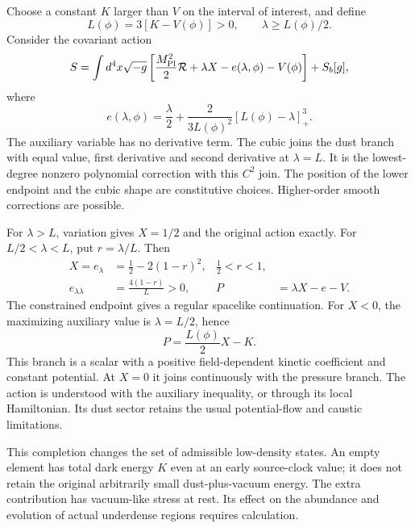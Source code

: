 \documentclass[11pt]{article}
\begin{document}
Choose a constant $K$ larger than $V$ on the interval of interest, and define
\begin{equation}
 L(\phi)=3[K-V(\phi)]>0,\qquad \lambda\ge L(\phi)/2.
\end{equation}
Consider the covariant action
\begin{equation}\label{eq:action}
 S=\int d^4x\sqrt{-g}\left[\frac{M_{\rm Pl}^2}{2}\mathcal R
       +\lambda X-e(\lambda,\phi)-V(\phi)\right]+S_b[g],
\end{equation}
where
\begin{equation}\label{eq:e}
 e(\lambda,\phi)=\frac{\lambda}{2}
       +\frac{2}{3L(\phi)^2}[L(\phi)-\lambda]_+^3.
\end{equation}
The auxiliary variable has no derivative term. The cubic joins the dust
branch with equal value, first derivative and second derivative at $\lambda=L$.
It is the lowest-degree nonzero polynomial correction with this $C^2$ join.
The position of the lower endpoint and the cubic shape are constitutive
choices. Higher-order smooth corrections are possible.

For $\lambda>L$, variation gives $X=1/2$ and the original action exactly.
For $L/2<\lambda<L$, put $r=\lambda/L$. Then
\begin{align}
 X=e_\lambda&=\tfrac12-2(1-r)^2, & \tfrac12<r<1,\label{eq:X}\\
 e_{\lambda\lambda}&=\frac{4(1-r)}{L}>0, &
 P&=\lambda X-e-V.
\end{align}
The constrained endpoint gives a regular spacelike continuation. For $X<0$,
the maximizing auxiliary value is $\lambda=L/2$, hence
\begin{equation}
 P=\frac{L(\phi)}{2}X-K.
\end{equation}
This branch is a scalar with a positive field-dependent kinetic coefficient
and constant potential. At $X=0$ it joins continuously with the pressure branch.
The action is understood with the auxiliary inequality, or through its local
Hamiltonian. Its dust sector retains the usual potential-flow and caustic
limitations.

This completion changes the set of admissible low-density states. An empty
element has total dark energy $K$ even at an early source-clock value; it
does not retain the original arbitrarily small dust-plus-vacuum energy.
The extra contribution has vacuum-like stress at rest. Its effect on the
abundance and evolution of actual underdense regions requires calculation.
\end{document}
